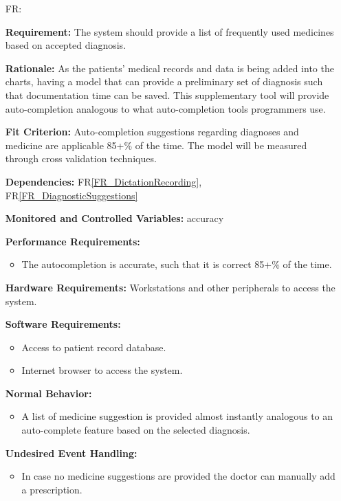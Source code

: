 \documentclass[12pt]{article}
\newcounter{reqnum} %
\begin{document}
\begin{itemize}
  
  \item[FR\refstepcounter{reqnum}\thereqnum \label{FR_medicalSuggestions}:] 
  
  \textbf{Requirement:} The system should provide a list of frequently used medicines based on accepted diagnosis.
  
  \textbf{Rationale:} As the patients' medical records and data is being added into the charts, having a model that can provide a preliminary set of diagnosis such that documentation time can be saved. This supplementary tool will provide auto-completion analogous to what auto-completion tools programmers use.
  
  \textbf{Fit Criterion:} Auto-completion suggestions regarding diagnoses and medicine are applicable 85+\% of the time. The model will be measured through cross validation techniques.
   
  \textbf{Dependencies:} FR\ref{FR_DictationRecording}, FR\ref{FR_DiagnosticSuggestions}
  
  \textbf{Monitored and Controlled Variables:} accuracy
  
  \textbf{Performance Requirements:}
  \begin{itemize}
    \item The autocompletion is accurate, such that it is correct 85+\% of the time. 
  \end{itemize}
  
  \textbf{Hardware Requirements:} 
  Workstations and other peripherals to access the system.
  
  \textbf{Software Requirements:}
  \begin{itemize}
    \item Access to patient record database.
    \item Internet browser to access the system. 
  \end{itemize}
  
  \textbf{Normal Behavior:}
  \begin{itemize}
    \item A list of medicine suggestion is provided almost instantly analogous to an auto-complete feature based on the selected diagnosis.
  \end{itemize}
  
  \textbf{Undesired Event Handling:}
  \begin{itemize}
    \item In case no medicine suggestions are provided the doctor can manually add a prescription.
  \end{itemize}
  

\end{itemize}
\end{document}
